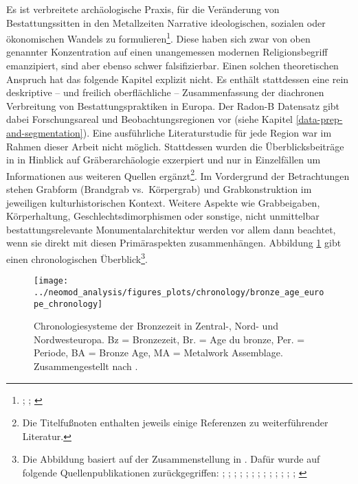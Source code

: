 \documentclass[openany,twoside,twocolumn]{book}
\let\rmarkdownfootnote\footnote%
\def\footnote{\protect\rmarkdownfootnote}
\begin{document}
Es ist verbreitete archäologische Praxis, für die Veränderung von
Bestattungssitten in den Metallzeiten Narrative ideologischen, sozialen
oder ökonomischen Wandels zu formulieren\footnote{\textcite{barrett_monumentality_1990};
  \textcite{fokkens_genesis_1997-1};
  \textcite{muller-scheesel_variabilitat_2009}}. Diese haben sich zwar
von oben genannter Konzentration auf einen unangemessen modernen
Religionsbegriff emanzipiert, sind aber ebenso schwer falsifizierbar.
Einen solchen theoretischen Anspruch hat das folgende Kapitel explizit
nicht. Es enthält stattdessen eine rein deskriptive -- und freilich
oberflächliche -- Zusammenfassung der diachronen Verbreitung von
Bestattungspraktiken in Europa. Der Radon-B Datensatz gibt dabei
Forschungsareal und Beobachtungsregionen vor (siehe Kapitel
\ref{data-prep-and-segmentation}). Eine ausführliche Literaturstudie für
jede Region war im Rahmen dieser Arbeit nicht möglich. Stattdessen
wurden die Überblicksbeiträge in \textcite{fokkens_oxford_2013} in
Hinblick auf Gräberarchäologie exzerpiert und nur in Einzelfällen um
Informationen aus weiteren Quellen ergänzt\footnote{Die Titelfußnoten
  enthalten jeweils einige Referenzen zu weiterführender Literatur.}. Im
Vordergrund der Betrachtungen stehen Grabform (Brandgrab vs.~Körpergrab)
und Grabkonstruktion im jeweiligen kulturhistorischen Kontext. Weitere
Aspekte wie Grabbeigaben, Körperhaltung, Geschlechtsdimorphismen oder
sonstige, nicht unmittelbar bestattungsrelevante Monumentalarchitektur
werden vor allem dann beachtet, wenn sie direkt mit diesen
Primäraspekten zusammenhängen. Abbildung \ref{fig:general-chronology}
gibt einen chronologischen Überblick\footnote{Die Abbildung basiert auf
  der Zusammenstellung in \textcite{roberts_old_2013}. Dafür wurde auf
  folgende Quellenpublikationen zurückgegriffen:
  \textcite{arnoldussen_bronze_2008}; \textcite{bourgeois_lage_2005};
  \textcite{burgess_bronze_1974}; \textcite{burgess_age_1980};
  \textcite{brindley_dating_2007}; \textcite{eogan_accomplished_1994};
  \textcite{gerloff_reineckes_2007}; \textcite{gerloff_atlantic_2010};
  \textcite{de_laet_belgique_1982};
  \textcite{lanting_14c-chronologie_2001};
  \textcite{louwe_kooijmanns_prehistory_2005};
  \textcite{needham_chronology_1996};
  \textcite{needham_independent_1997}; \textcite{needham_first_2010}}.

\begin{landscape}
\begin{figure}[!t]

{\centering \texttt{[image: ../neomod\_analysis/figures\_plots/chronology/bronze\_age\_europe\_chronology]} 

}

\caption[Chronologiesysteme der Bronzezeit in Zentral-, Nord- und Nordwesteuropa]{Chronologiesysteme der Bronzezeit in Zentral-, Nord- und Nordwesteuropa. Bz = Bronzezeit, Br. = Age du bronze, Per. = Periode, BA = Bronze Age, MA = Metalwork Assemblage. Zusammengestellt nach \textcite{roberts_old_2013}.}\label{fig:general-chronology}
\end{figure}
\end{landscape}
\end{document}

